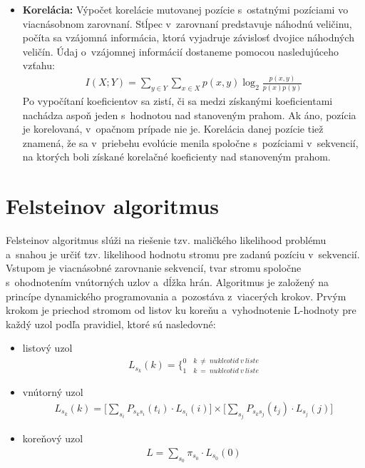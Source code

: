 \begin{itemize}
	\item \textbf{Korelácia:} Výpočet korelácie mutovanej pozície s~ostatnými pozíciami vo viacnásobnom zarovnaní. Stĺpec v~zarovnaní predstavuje náhodnú veličinu, počíta sa vzájomná informácia, ktorá vyjadruje závislosť dvojice náhodných veličín. Údaj o~vzájomnej informácií dostaneme pomocou nasledujúceho vzťahu: 	
	\begin{align}
	I(X;Y) = \underset{y \in Y}{\sum} \underset{x \in X}{\sum} p(x,y) \log_{2}\frac{p(x,y)}{p(x) p(y)}
	\end{align}  
	Po vypočítaní koeficientov sa zistí, či sa medzi získanými koeficientami nachádza aspoň jeden s~hodnotou nad stanoveným prahom. Ak áno, pozícia je korelovaná, v~opačnom prípade nie je. Korelácia danej pozície tiež znamená, že sa v~priebehu evolúcie menila spoločne s~pozíciami v~sekvencií, na ktorých boli získané korelačné koeficienty nad stanoveným prahom. 
	
\end{itemize}

\section{Felsteinov algoritmus}
\label{felstein}
Felsteinov algoritmus slúži na riešenie tzv. maličkého likelihood problému a~snahou je určiť tzv. likelihood hodnotu stromu pre zadanú pozíciu v~sekvencií. Vstupom je viacnásobné zarovnanie sekvencií, tvar stromu spoločne s~ohodnotením vnútorných uzlov a~dĺžka hrán. 
Algoritmus je založený na princípe dynamického programovania a~pozostáva z~viacerých krokov.
Prvým krokom je priechod stromom od listov ku koreňu a~vyhodnotenie L-hodnoty pre každý uzol podľa pravidiel, ktoré sú nasledovné:
\begin{itemize}
	\item listový uzol
	\begin{align}
	L_{s_{k}} (k) = \bigg\{_{1\quad k\ =\ nukleotid\ v\  liste}^{0\quad k\ \neq\ nukleotid\ v\  liste}
	\end{align}  
	
	\item vnútorný uzol
	\begin{align}
	L_{s_{k}} (k) = \Bigg[\underset{s_{i}}{\sum}P_{s_{k}s_{i}}(t_{i})\cdotp L_{s_{i}}(i)\Bigg] \times \Bigg[\underset{s_{j}}{\sum}P_{s_{k}s_{j}}(t_{j})\cdotp L_{s_{j}}(j)\Bigg]
	\end{align}
	
	\item koreňový uzol
	\begin{align}
	L = \underset{s_{0}}{\sum}\pi_{s_{0}} \cdotp L_{s_{0}}(0)
	\end{align} 

\end{itemize}

